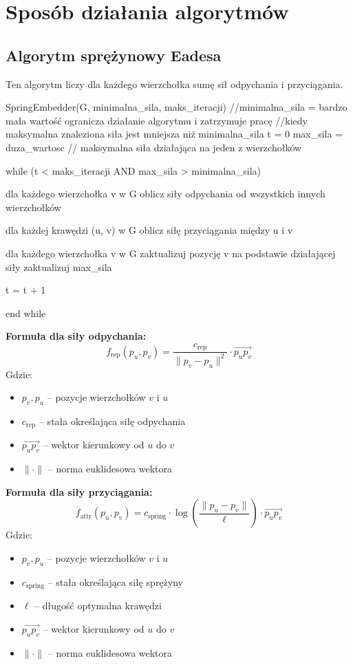 \documentclass[]{article}
\begin{document}
	\section{Sposób działania algorytmów}
	\subsection{Algorytm sprężynowy Eadesa}
	Ten algorytm liczy dla każdego wierzchołka sumę sił odpychania i przyciągania.
	\begin{mylisting}
SpringEmbedder(G, minimalna_sila, maks_iteracji)
//minimalna_sila = bardzo mała wartość ogranicza działanie algorytmu i zatrzymuje pracę
//kiedy maksymalna znaleziona siła jest mniejsza niż minimalna_sila
t = 0
max_sila = duza_wartosc // maksymalna siła działająca na jeden z wierzchołków

while (t < maks_iteracji AND max_sila > minimalna_sila)

    dla każdego wierzchołka v w G
        oblicz siły odpychania od wszystkich innych wierzchołków

    dla każdej krawędzi (u, v) w G
        oblicz siłę przyciągania między u i v

    dla każdego wierzchołka v w G
        zaktualizuj pozycję v na podstawie działającej siły
        zaktualizuj max_sila

    t = t + 1

end while
\end{mylisting}
\textbf{Formuła dla siły odpychania:}
\begin{equation}
	f_{\mathrm{rep}}(p_u,p_v) =
	\frac{c_{\mathrm{rep}}}{\|p_v - p_u\|^2} \cdot \vec{p_u p_v}
\end{equation}
Gdzie:
\begin{itemize}
    \item $p_v, p_u$ -- pozycje wierzchołków $v$ i $u$
    \item $c_{\mathrm{rep}}$ -- stała określająca siłę odpychania
    \item $\vec{p_u p_v}$ -- wektor kierunkowy od $u$ do $v$
    \item $\|\cdot\|$ -- norma euklidesowa wektora
\end{itemize}
\textbf{Formuła dla siły przyciągania:}
\begin{equation}
	f_{\mathrm{attr}}(p_u,p_v) =
	c_{\mathrm{spring}} \cdot
	\log\!\left(\frac{\|p_u - p_v\|}{\ell}\right)
	\cdot \vec{p_u p_v}
\end{equation}
Gdzie:
\begin{itemize}
    \item $p_v, p_u$ -- pozycje wierzchołków $v$ i $u$
    \item $c_{\mathrm{spring}}$ -- stała określająca siłę sprężyny
    \item $\ell$ -- długość optymalna krawędzi
    \item $\vec{p_u p_v}$ -- wektor kierunkowy od $u$ do $v$
    \item $\|\cdot\|$ -- norma euklidesowa wektora
\end{itemize}
\end{document}
